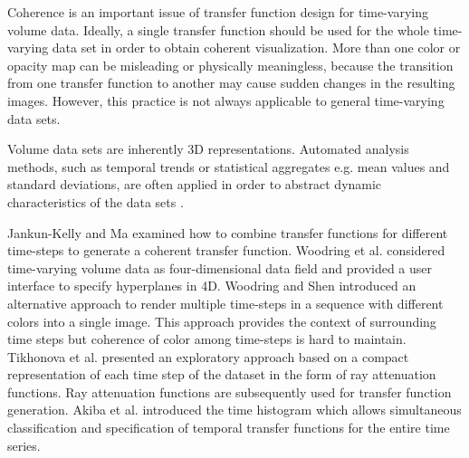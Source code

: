 Coherence is an important issue of transfer function design for time-varying volume data. Ideally, a single transfer function should be used for the whole time-varying data set in order to obtain coherent visualization. More than one color or opacity map can be misleading or physically meaningless, because the transition from one transfer function to another may cause sudden changes in the resulting images. However, this practice is not always applicable to general time-varying data sets.

Volume data sets are inherently 3D representations. Automated analysis methods, such as temporal trends or statistical aggregates e.g. mean values and standard deviations, are often applied in order to abstract dynamic characteristics of the data sets \cite{kehrer_visualization_2013}.

Jankun-Kelly and Ma \cite{jankun-kelly_study_2001} examined how to combine transfer functions for different time-steps to generate a coherent transfer function.
Woodring et al. \cite{woodring_high_2003} considered time-varying volume data as four-dimensional data field and provided a user interface to specify hyperplanes in 4D.
Woodring and Shen \cite{woodring_chronovolumes_2003} introduced an alternative approach to render multiple time-steps in a sequence with different colors into a single image. This approach provides the context of surrounding time steps but coherence of color among time-steps is hard to maintain.
Tikhonova et al. \cite{tikhonova_exploratory_2010} presented an exploratory approach based on a compact representation of each time step of the dataset in the form of ray attenuation functions. Ray attenuation functions are subsequently used for transfer function generation.
Akiba et al. \cite{akiba_simultaneous_2006} introduced the time histogram which allows simultaneous classification and specification of temporal transfer functions for the entire time series.

